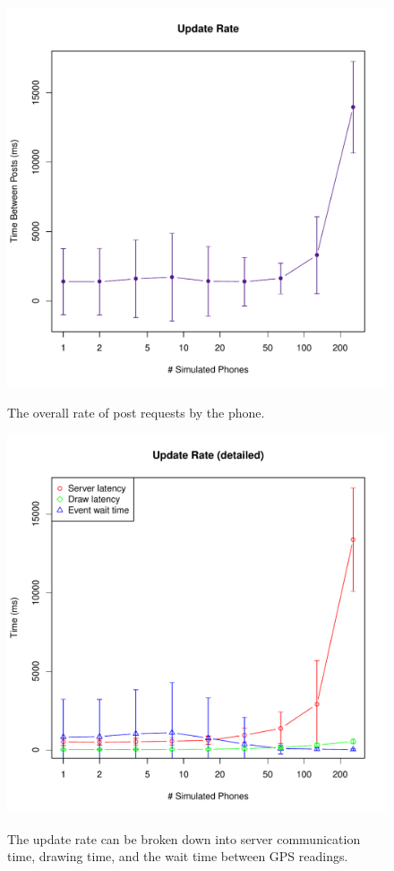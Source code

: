 \documentclass{acm_proc_article-sp}
\begin{document}
\begin{figure}
\centering
\includegraphics[scale=0.5]{figs/phoneUpdateRate}
\label{fig:phoneUpdateRate}
\caption{The overall rate of post requests by the phone.}
\end{figure}

\begin{figure}
\centering
\includegraphics[scale=0.5]{figs/phoneUpdateRateDetailed}
\label{fig:phoneUpdateRateDetailed}
\caption{The update rate can be broken down into server communication time, drawing time, and the wait time between GPS readings.}
\end{figure}
\end{document}
